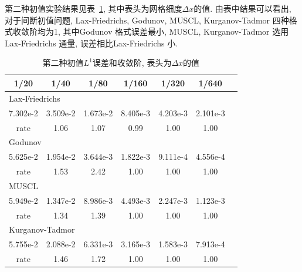 \documentclass[a4paper, 12pt]{amsart}
\numberwithin{equation}{section}
\begin{document}
第二种初值实验结果见表~\ref{tab:task2}, 其中表头为网格细度$\Delta x$的值. 由表中结果可以看出, 对于间断初值问题, Lax-Friedrichs, Godunov, MUSCL, Kurganov-Tadmor 四种格式收敛阶均为1, 其中Godunov 格式误差最小, MUSCL, Kurganov-Tadmor 选用Lax-Friedrichs 通量, 误差相比Lax-Friedrichs 小.
\begin{table}[htbp]\centering\caption{第二种初值$L^1$误差和收敛阶, 表头为$\Delta x$的值}\label{tab:task2}
\begin{tabular}{ccccccc}
\hline\hline
1/20 & 1/40 & 1/80 & 1/160 & 1/320 & 1/640\\
\hline\hline
\multicolumn{6}{l}{Lax-Friedrichs}\\
7.302e-2 & 3.509e-2 & 1.673e-2 & 8.405e-3 & 4.203e-3 & 2.101e-3\\
rate & 1.06 & 1.07 & 0.99 & 1.00 & 1.00\\
\hline
\multicolumn{6}{l}{Godunov}\\
5.625e-2 & 1.954e-2 & 3.644e-3 & 1.822e-3 & 9.111e-4 & 4.556e-4\\
rate & 1.53 & 2.42 & 1.00 & 1.00 & 1.00\\
\hline
\multicolumn{6}{l}{MUSCL}\\
5.949e-2 & 1.347e-2 & 8.986e-3 & 4.493e-3 & 2.247e-3 & 1.123e-3\\
rate & 1.34 & 1.39 & 1.00 & 1.00 & 1.00\\
\hline
\multicolumn{6}{l}{Kurganov-Tadmor}\\
5.755e-2 & 2.088e-2 & 6.331e-3 & 3.165e-3 & 1.583e-3 & 7.913e-4\\
rate & 1.46 & 1.72 & 1.00 & 1.00 & 1.00\\
\hline\hline
\end{tabular}\end{table}
\end{document}
